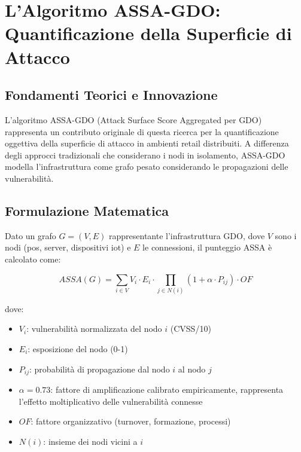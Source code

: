

\section{\texorpdfstring{L'Algoritmo ASSA-GDO: Quantificazione della Superficie di Attacco}{2.4 - L'Algoritmo ASSA-GDO: Quantificazione della Superficie di Attacco}}

\subsection{\texorpdfstring{Fondamenti Teorici e Innovazione}{2.4.1 - Fondamenti Teorici e Innovazione}}

L'algoritmo ASSA-GDO (Attack Surface Score Aggregated per GDO) rappresenta un contributo originale di questa ricerca per la quantificazione oggettiva della superficie di attacco in ambienti retail distribuiti. A differenza degli approcci tradizionali che considerano i nodi in isolamento, ASSA-GDO modella l'infrastruttura come grafo pesato considerando le propagazioni delle vulnerabilità.

\subsection{\texorpdfstring{Formulazione Matematica}{2.4.2 - Formulazione Matematica}}

Dato un grafo $G = (V, E)$ rappresentante l'infrastruttura GDO, dove $V$ sono i nodi (\gls{pos}, server, dispositivi \gls{iot}) e $E$ le connessioni, il punteggio ASSA è calcolato come:

\begin{equation}
ASSA(G) = \sum_{i \in V} V_i \cdot E_i \cdot \prod_{j \in N(i)} (1 + \alpha \cdot P_{ij}) \cdot OF
\end{equation}

dove:
\begin{itemize}
    \item $V_i$: vulnerabilità normalizzata del nodo $i$ (CVSS/10)
    \item $E_i$: esposizione del nodo (0-1)
    \item $P_{ij}$: probabilità di propagazione dal nodo $i$ al nodo $j$
    \item $\alpha = 0.73$: fattore di amplificazione calibrato empiricamente, rappresenta l'effetto moltiplicativo delle vulnerabilità connesse
    \item $OF$: fattore organizzativo (turnover, formazione, processi)
    \item $N(i)$: insieme dei nodi vicini a $i$
\end{itemize}

